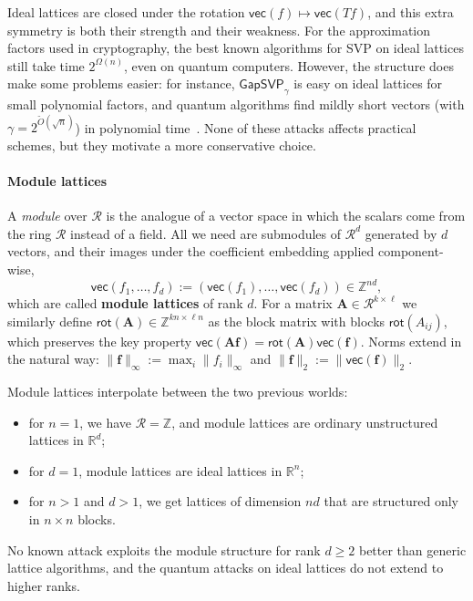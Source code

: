 \documentclass[../../book.tex]{subfiles}
\begin{document}
Ideal lattices are closed under the rotation $\mathsf{vec}(f) \mapsto \mathsf{vec}(Tf)$, and this extra symmetry is both their strength and their weakness.
For the approximation factors used in cryptography, the best known algorithms for SVP on ideal lattices still take time $2^{\Omega(n)}$, even on quantum computers.
However, the structure does make some problems easier: for instance, $\mathsf{GapSVP}_{\gamma}$ is easy on ideal lattices for small polynomial factors, and quantum algorithms find mildly short vectors (with $\gamma = 2^{\widetilde{O}(\sqrt{n})}$) in polynomial time~\cite{JACM:CraLeoWes21}.
None of these attacks affects practical schemes, but they motivate a more conservative choice.

\paragraph{Module lattices}
A \emph{module} over $\mathcal{R}$ is the analogue of a vector space in which the scalars come from the ring $\mathcal{R}$ instead of a field.
All we need are submodules of $\mathcal{R}^d$ generated by $d$ vectors, and their images under the coefficient embedding applied component-wise,
\begin{equation*}
    \mathsf{vec}(f_1,\dots,f_d) := (\mathsf{vec}(f_1),\dots,\mathsf{vec}(f_d)) \in \mathbb{Z}^{nd},
\end{equation*}
which are called \textbf{module lattices} of rank $d$.
For a matrix $\mathbf{A} \in \mathcal{R}^{k \times \ell}$ we similarly define $\mathsf{rot}(\mathbf{A}) \in \mathbb{Z}^{kn \times \ell n}$ as the block matrix with blocks $\mathsf{rot}(A_{ij})$, which preserves the key property $\mathsf{vec}(\mathbf{A}\mathbf{f}) = \mathsf{rot}(\mathbf{A})\mathsf{vec}(\mathbf{f})$.
Norms extend in the natural way: $\|\mathbf{f}\|_{\infty} := \max_i \|f_i\|_{\infty}$ and $\|\mathbf{f}\|_2 := \|\mathsf{vec}(\mathbf{f})\|_2$.

Module lattices interpolate between the two previous worlds:
\begin{itemize}
    \item for $n = 1$, we have $\mathcal{R} = \mathbb{Z}$, and module lattices are ordinary unstructured lattices in $\mathbb{R}^d$;
    \item for $d = 1$, module lattices are ideal lattices in $\mathbb{R}^n$;
    \item for $n > 1$ and $d > 1$, we get lattices of dimension $nd$ that are structured only in $n \times n$ blocks.
\end{itemize}
No known attack exploits the module structure for rank $d \geq 2$ better than generic lattice algorithms, and the quantum attacks on ideal lattices do not extend to higher ranks.
\end{document}
